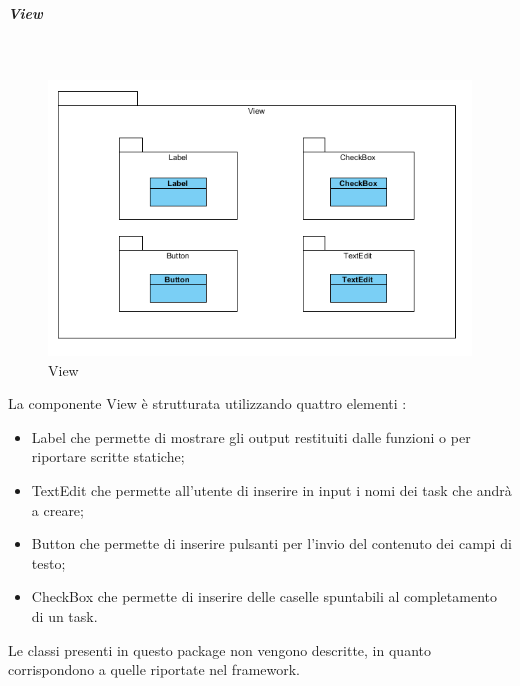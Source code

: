 \subparagraph{View}\mbox{}\\
\nopagebreak
\begin{figure}[H]
	\centering
	\includegraphics[width=14cm]{../../documenti/SpecificaTecnica/diagrammi_img/classi_e_package/todo_view.png}
	\caption{View}
\end{figure}
La componente View è strutturata utilizzando quattro elementi :
\begin{itemize}
	\item Label che permette di mostrare gli output restituiti dalle funzioni o per riportare scritte statiche;
	\item TextEdit che permette all’utente di inserire in input i nomi dei task che andrà a creare;
	\item Button che permette di inserire pulsanti per l’invio del contenuto dei campi di testo;
	\item CheckBox che permette di inserire delle caselle spuntabili al completamento di un task.
\end{itemize}
Le classi presenti in questo package non vengono descritte, in quanto corrispondono a quelle riportate nel framework.

